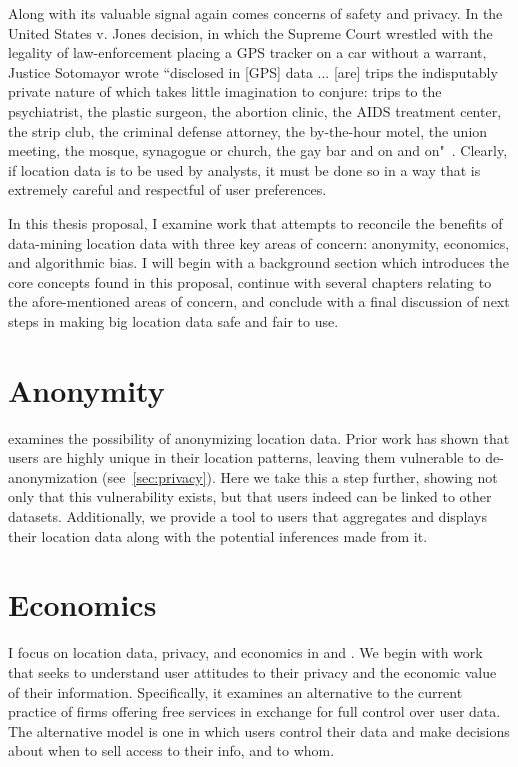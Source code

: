 Along with its valuable signal again comes concerns of safety and privacy.
In the United States v. Jones decision, in which the Supreme Court wrestled with the legality of law-enforcement placing a GPS tracker on a car without a warrant, Justice Sotomayor wrote 
``disclosed in [GPS] data ... [are] trips the indisputably private nature of which takes little imagination to conjure: trips to the psychiatrist, the plastic surgeon, the abortion clinic, the AIDS treatment center, the strip club, the criminal defense attorney, the by-the-hour motel, the union meeting, the mosque, synagogue or church, the gay bar and on and on"~\cite{jones2012us}.
Clearly, if location data is to be used by analysts, it must be done so in a way that is extremely careful and respectful of user preferences.

In this thesis proposal, I examine work that attempts to reconcile the benefits of data-mining location data with three key areas of concern: anonymity, economics, and algorithmic bias.
I will begin with a background section which introduces the core concepts found in this proposal, continue with several chapters relating to the afore-mentioned areas of concern, and conclude with a final discussion of next steps in making big location data safe and fair to use.

\section{Anonymity}
 examines the possibility of anonymizing location data. %
Prior work has shown that users are highly unique in their location patterns, leaving them vulnerable to de-anonymization (see~\ref{sec:privacy}).
Here we take this a step further, showing not only that this vulnerability exists, but that users indeed can be linked to other datasets.
Additionally, we provide a tool to users that aggregates and displays their location data along with the potential inferences made from it.

\section{Economics}
I focus on location data, privacy, and economics in  and .
We begin with work that seeks to understand user attitudes to their privacy and the economic value of their information.
Specifically, it examines an alternative to the current practice of firms offering free services in exchange for full control over user data.
The alternative model is one in which users control their data and make decisions about when to sell access to their info, and to whom.


